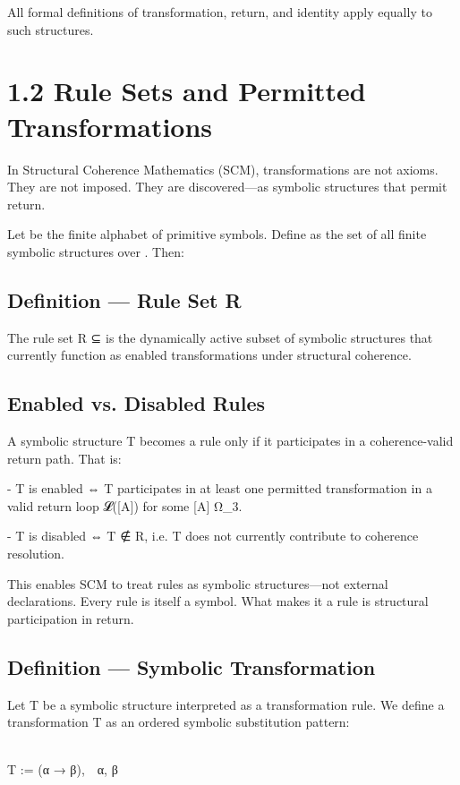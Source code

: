 All formal definitions of transformation, return, and identity apply equally to such structures.

\section{1.2 \textbar{} Rule Sets and Permitted
Transformations}\label{rule-sets-and-permitted-transformations}

In Structural Coherence Mathematics (SCM), transformations are not
axioms. They are not imposed. They are discovered---as symbolic
structures that permit return.

Let \Sigma be the finite alphabet of primitive symbols. Define \Sigma* as the set
of all finite symbolic structures over \Sigma. Then:

\subsection{Definition --- Rule Set R}\label{definition-rule-set-r}

The rule set R ⊆ \Sigma* is the dynamically active subset of symbolic
structures that currently function as enabled transformations under
structural coherence.

\subsection{Enabled vs. Disabled
Rules}\label{enabled-vs.-disabled-rules}

A symbolic structure T \in \Sigma* becomes a rule only if it participates in a
coherence-valid return path. That is:

- T is enabled ⇔ T participates in at least one permitted transformation
in a valid return loop 𝓛({[}A{]}) for some {[}A{]} \in Ω_3.

- T is disabled ⇔ T ∉ R, i.e. T does not currently contribute to
coherence resolution.

This enables SCM to treat rules as symbolic structures---not external
declarations. Every rule is itself a symbol. What makes it a rule is
structural participation in return.

\subsection{Definition --- Symbolic
Transformation}\label{definition-symbolic-transformation}

Let T \in \Sigma* be a symbolic structure interpreted as a transformation rule.
We define a transformation T as an ordered symbolic substitution
pattern:\\
\strut \\
T := (α → β), α, β \in \Sigma*

